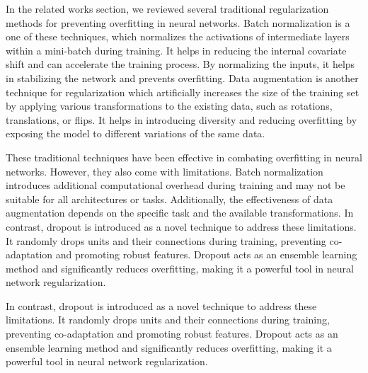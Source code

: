 \documentclass{article}
\begin{document}
In the related works section, we reviewed several traditional regularization methods for preventing overfitting in neural networks. Batch normalization is a one of these techniques, which normalizes the activations of intermediate layers within a mini-batch during training. It helps in reducing the internal covariate shift and can accelerate the training process. By normalizing the inputs, it helps in stabilizing the network and prevents overfitting. Data augmentation is another technique for regularization which artificially increases the size of the training set by applying various transformations to the existing data, such as rotations, translations, or flips. It helps in introducing diversity and reducing overfitting by exposing the model to different variations of the same data. 

These traditional techniques have been effective in combating overfitting in neural networks. However, they also come with limitations. Batch normalization introduces additional computational overhead during training and may not be suitable for all architectures or tasks. Additionally, the effectiveness of data augmentation depends on the specific task and the available transformations. In contrast, dropout is introduced as a novel technique to address these limitations. It randomly drops units and their connections during training, preventing co-adaptation and promoting robust features. Dropout acts as an ensemble learning method and significantly reduces overfitting, making it a powerful tool in neural network regularization.

In contrast, dropout is introduced as a novel technique to address these limitations. It randomly drops units and their connections during training, preventing co-adaptation and promoting robust features. Dropout acts as an ensemble learning method and significantly reduces overfitting, making it a powerful tool in neural network regularization.

\begin{figure}[!tbp]
  \centering
  \hfill
  \caption{}
\end{figure}
\end{document}
